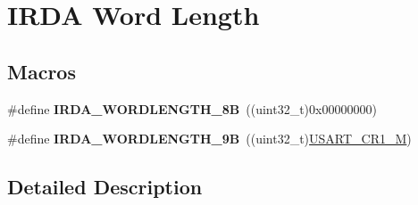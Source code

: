 \hypertarget{group___i_r_d_a___word___length}{}\section{I\+R\+DA Word Length}
\label{group___i_r_d_a___word___length}
\subsection*{Macros}
\begin{DoxyCompactItemize}
\item 
\#define {\bfseries I\+R\+D\+A\+\_\+\+W\+O\+R\+D\+L\+E\+N\+G\+T\+H\+\_\+8B}~((uint32\+\_\+t)0x00000000)\hypertarget{group___i_r_d_a___word___length_ga53b28028ae932349fcc40190dd8d7c9a}{}\label{group___i_r_d_a___word___length_ga53b28028ae932349fcc40190dd8d7c9a}

\item 
\#define {\bfseries I\+R\+D\+A\+\_\+\+W\+O\+R\+D\+L\+E\+N\+G\+T\+H\+\_\+9B}~((uint32\+\_\+t)\hyperlink{group___peripheral___registers___bits___definition_ga95f0288b9c6aaeca7cb6550a2e6833e2}{U\+S\+A\+R\+T\+\_\+\+C\+R1\+\_\+M})\hypertarget{group___i_r_d_a___word___length_gad005e4d28476758d4e5b56a3d98f7cd4}{}\label{group___i_r_d_a___word___length_gad005e4d28476758d4e5b56a3d98f7cd4}

\end{DoxyCompactItemize}


\subsection{Detailed Description}
